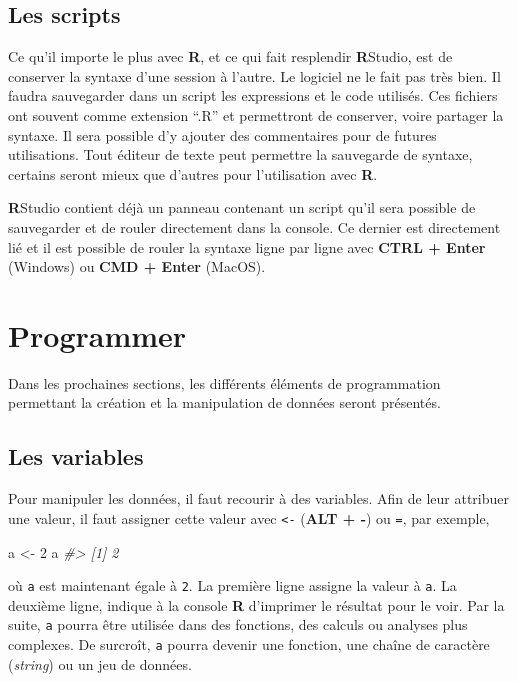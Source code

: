 \documentclass[
]{book}
\newenvironment{Shaded}{}{}
\newcommand{\CommentTok}[1]{\textit{#1}}
\newcommand{\DecValTok}[1]{#1}
\newcommand{\NormalTok}[1]{#1}
\newcommand{\OtherTok}[1]{#1}
\begin{document}
\hypertarget{les-scripts}{%
\section{Les scripts}\label{les-scripts}}

Ce qu'il importe le plus avec \textbf{R}, et ce qui fait resplendir \textbf{R}Studio, est de conserver la syntaxe d'une session à l'autre. Le logiciel ne le fait pas très bien. Il faudra sauvegarder dans un script les expressions et le code utilisés. Ces fichiers ont souvent comme extension ``.R'' et permettront de conserver, voire partager la syntaxe. Il sera possible d'y ajouter des commentaires pour de futures utilisations. Tout éditeur de texte peut permettre la sauvegarde de syntaxe, certains seront mieux que d'autres pour l'utilisation avec \textbf{R}.

\textbf{R}Studio contient déjà un panneau contenant un script qu'il sera possible de sauvegarder et de rouler directement dans la console. Ce dernier est directement lié et il est possible de rouler la syntaxe ligne par ligne avec \textbf{CTRL + Enter} (Windows) ou \textbf{CMD + Enter} (MacOS).

\hypertarget{programmer}{%
\chapter{Programmer}\label{programmer}}

Dans les prochaines sections, les différents éléments de programmation permettant la création et la manipulation de données seront présentés.

\hypertarget{les-variables}{%
\section{Les variables}\label{les-variables}}

Pour manipuler les données, il faut recourir à des variables. Afin de leur attribuer une valeur, il faut assigner cette valeur avec \texttt{\textless{}-} (\textbf{ALT + -}) ou \texttt{=}, par exemple,

\begin{Shaded}
\begin{Highlighting}[]
\NormalTok{a }\OtherTok{\textless{}{-}} \DecValTok{2}
\NormalTok{a}
\CommentTok{\#\textgreater{} [1] 2}
\end{Highlighting}
\end{Shaded}

où \texttt{a} est maintenant égale à \texttt{2}. La première ligne assigne la valeur à \texttt{a}. La deuxième ligne, indique à la console \textbf{R} d'imprimer le résultat pour le voir. Par la suite, \texttt{a} pourra être utilisée dans des fonctions, des calculs ou analyses plus complexes. De surcroît, \texttt{a} pourra devenir une fonction, une chaîne de caractère (\emph{string}) ou un jeu de données.
\end{document}
